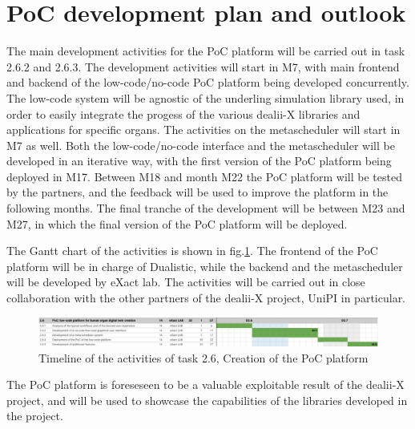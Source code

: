 \documentclass[a4paper,12pt]{article}
\begin{document}
\section{\textcolor{EUblue}{PoC development plan and outlook}}

The main development activities for the PoC platform will be carried out in task 2.6.2 and 2.6.3. The development activities will start in M7, with main frontend and backend of the low-code/no-code PoC platform being developed concurrently. The low-code system will be agnostic of the underling simulation library used, in order to easily integrate the progess of the various dealii-X libraries and applications for specific organs. The activities on the metascheduler will start in M7 as well. Both the low-code/no-code interface and the metascheduler will be developed in an iterative way, with the first version of the PoC platform being deployed in M17. Between M18 and month M22 the PoC platform will be tested by the partners, and the feedback will be used to improve the platform in the following months. The final tranche of the development will be between M23 and M27, in which the final version of the PoC platform will be deployed.

The Gantt chart of the activities is shown in fig.\ref{gannt}. The frontend of the PoC platform will be in charge of Dualistic, while the backend and the metascheduler will be developed by eXact lab. The activities will be carried out in close collaboration with the other partners of the dealii-X project, UniPI in particular. 
\begin{figure}
    \label{gannt}
    \includegraphics[width=400pt]{gantt.png}
    \caption{Timeline of the activities of task 2.6, Creation of the PoC platform}
\end{figure}
The PoC platform is foreseseen to be a valuable exploitable result of the dealii-X project, and will be used to showcase the capabilities of the libraries developed in the project.

\label{MyLastPage}
\end{document}

